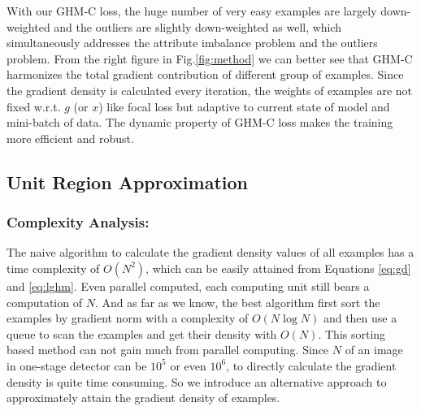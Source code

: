 \documentclass[letterpaper]{article} %
\begin{document}
With our GHM-C loss, the huge number of very easy examples are largely down-weighted and the outliers are slightly down-weighted as well, which simultaneously addresses the attribute imbalance problem and the outliers problem. From the right figure in Fig.\ref{fig:method} we can better see that GHM-C harmonizes the total gradient contribution of different group of examples. Since the gradient density is calculated every iteration, the weights of examples are not fixed w.r.t. $g$ (or $x$) like focal loss but adaptive to current state of model and mini-batch of data. The dynamic property of  GHM-C loss makes the training more efficient and robust.

\subsection{Unit Region Approximation}
\subsubsection{Complexity Analysis:} The naive algorithm to calculate the gradient density values of all examples has a time complexity of $O(N^2)$, which can be easily attained from Equations \ref{eq:gd} and \ref{eq:lghm}. Even parallel computed, each computing unit still bears a computation of $N$. And as far as we know, the best algorithm first sort the examples by gradient norm with a complexity of $O(N\log N)$ and then use a queue to scan the examples and get their density with $O(N)$. This sorting based method can not gain much from parallel computing. Since $N$ of an image in one-stage detector can be $10^5$ or even $10^6$, to directly calculate the gradient density is quite time consuming. So we introduce an alternative approach to approximately attain the gradient density of examples.
\end{document}
